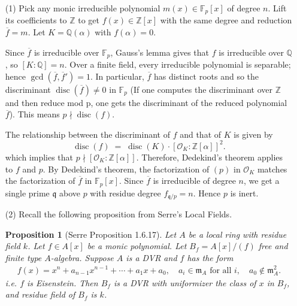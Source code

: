 \documentclass[12pt]{article}  %
\newtheorem{proposition}[theorem]{Proposition}
\begin{document}
\begin{solution}
    \begin{enumerate}
        \item[(1)] Pick any monic irreducible polynomial $m(x)\in\mathbb{F}_p[x]$ of degree $n$. Lift its coefficients to $\mathbb{Z}$ to get $f(x)\in\mathbb{Z}[x]$ with the same degree and reduction $\overline{f}=m$. Let $K=\mathbb{Q}(\alpha)$ with $f(\alpha)=0$.

              Since $\overline{f}$ is irreducible over $\mathbb{F}_p$, Gauss's lemma gives that $f$ is irreducible over $\mathbb{Q}$, so $[K:\mathbb{Q}]=n$. Over a finite field, every irreducible polynomial is separable; hence $\gcd(\overline{f},\overline{f}')=1$. In particular, $\overline{f}$ has distinct roots and so the discriminant $\operatorname{disc}(\overline{f})\neq 0$ in $\mathbb{F}_p$ (If one computes the discriminant over $\mathbb{Z}$ and then reduce mod p, one gets the discriminant of the reduced polynomial $\overline f$). This means $p\nmid\operatorname{disc}(f)$.



              The relationship between the discriminant of $f$ and that of $K$ is given by
              \[\operatorname{disc}(f) \;=\; \operatorname{disc}(K)\cdot [\mathcal{O}_K:\mathbb{Z}[\alpha]]^2.
              \] which implies that $p\nmid [\mathcal{O}_K:\mathbb{Z}[\alpha]]$. Therefore, Dedekind's theorem applies to $f$ and $p$. By Dedekind's theorem, the factorization of $(p)$ in $\mathcal{O}_K$ matches the factorization of $\overline{f}$ in $\mathbb{F}_p[x]$. Since $\overline{f}$ is irreducible of degree $n$, we get a single prime $\mathfrak{q}$ above $p$ with residue degree $f_{\mathfrak{q}/p}=n$. Hence $p$ is inert.

        \item[(2)] Recall the following proposition from Serre's Local Fields.
              \begin{proposition}[Serre Proposition 1.6.17]
                  Let $A$ be a local ring with residue field $k$. Let $f \in A[x]$ be a monic polynomial. Let $B_f = A[x]/(f)$ free and finite type $A$-algebra. Suppose $A$ is a DVR and $f$ has the form \begin{align*}
                      f(x) = x^n + a_{n-1}x^{n-1} + \cdots + a_1 x + a_0, \quad a_i \in \mathfrak{m}_A \text{ for all } i, \quad a_0 \notin \mathfrak{m}_A^2.
                  \end{align*} i.e. $f$ is Eisenstein. Then $B_f$ is a DVR with uniformizer the class of $x$ in $B_f$, and residue field of $B_f$ is $k$.
              \end{proposition}


\end{enumerate}
\end{solution}
\end{document}
